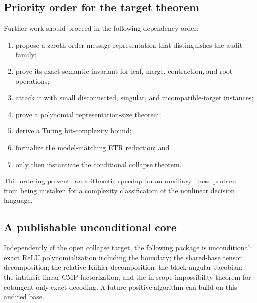 \subsection{Priority order for the target theorem}

Further work should proceed in the following dependency order:
\begin{enumerate}
  \item propose a zeroth-order message representation that distinguishes the
  audit family;
  \item prove its exact semantic invariant for leaf, merge, contraction, and
  root operations;
  \item attack it with small disconnected, singular, and incompatible-target
  instances;
  \item prove a polynomial representation-size theorem;
  \item derive a Turing bit-complexity bound;
  \item formalize the model-matching ETR reduction; and
  \item only then instantiate the conditional collapse theorem.
\end{enumerate}

This ordering prevents an arithmetic speedup for an auxiliary linear problem
from being mistaken for a complexity classification of the nonlinear decision
language.

\subsection{A publishable unconditional core}

Independently of the open collapse target, the following package is
unconditional: exact ReLU polynomialization including the boundary; the
shared-base tensor decomposition; the relative K\"ahler decomposition; the
block-angular Jacobian; the intrinsic linear CMP factorization; and the
in-scope impossibility theorem for cotangent-only exact decoding.  A future
positive algorithm can build on this audited base.
